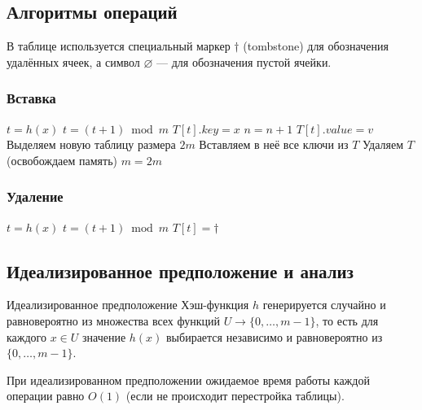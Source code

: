 \subsection{Алгоритмы операций}

В таблице используется специальный маркер $\dagger$ (tombstone) для обозначения удалённых ячеек, а символ $\varnothing$ — для обозначения пустой ячейки.

\subsubsection*{Вставка}

\begin{algorithmic}[1]
	\State $t = h(x)$
	\State $t = (t + 1) \bmod m$
	\EndWhile
	\State $T[t].\mathit{key} = x$
	\State $n = n + 1$
	\EndIf
	\State $T[t].\mathit{value} = v$
	\State Выделяем новую таблицу размера $2m$
	\State Вставляем в неё все ключи из $T$
	\State Удаляем $T$ (освобождаем память)
	\State $m = 2m$
	\EndIf
\end{algorithmic}

\subsubsection*{Удаление}

\begin{algorithmic}[1]
	\State $t = h(x)$
	\State $t = (t + 1) \bmod m$
	\EndWhile
	\State $T[t] = \dagger$
	\EndIf
\end{algorithmic}

\subsection{Идеализированное предположение и анализ}

\begin{Definition}{Идеализированное предположение}{}
	Хэш-функция $h$ генерируется случайно и равновероятно из множества всех функций $U \to \{0, \ldots, m-1\}$, то есть для каждого $x \in U$ значение $h(x)$ выбирается независимо и равновероятно из $\{0, \ldots, m-1\}$.
\end{Definition}

\begin{Theorem}{}{}
	При идеализированном предположении ожидаемое время работы каждой операции равно $O(1)$ (если не происходит перестройка таблицы).
\end{Theorem}

